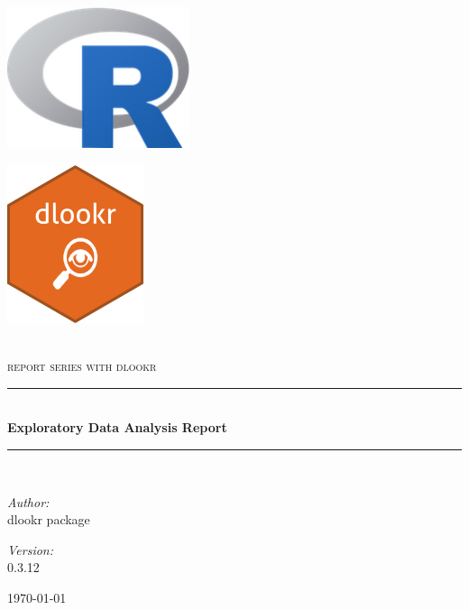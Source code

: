 \documentclass{book}\usepackage[]{graphicx}\usepackage[]{color}
\begin{document}
\newcommand{\HRule}{\rule{\linewidth}{0.5mm}}

\begin{titlepage}
\begin{center}

\begin{minipage}{0.4\textwidth}
\begin{flushleft} \large
\includegraphics[width=0.4\textwidth]{./img/Rlogo}~\\[1cm]
\end{flushleft}
\end{minipage}
\begin{minipage}{0.4\textwidth}
\begin{flushright} \large
\includegraphics[width=0.3\textwidth]{./img/detective_2}~\\[1cm]
\end{flushright}
\end{minipage}\\[4.5cm]

\textsc{\Large report series with dlookr}\\[1.0cm]

\HRule \\[0.4cm]
{ \huge \bfseries Exploratory Data Analysis Report \\[0.4cm] }

\HRule \\[4.5cm]

\begin{minipage}{0.4\textwidth}
\begin{flushleft} \large
\emph{Author:}\\
dlookr package
\end{flushleft}
\end{minipage}
\begin{minipage}{0.4\textwidth}
\begin{flushright} \large
\emph{Version:} \\
0.3.12
\end{flushright}
\end{minipage}

\vfill

{\large \today}

\end{center}
\end{titlepage}
\end{document}
